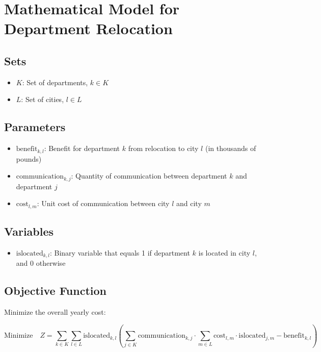 \documentclass{article}
\begin{document}
\section*{Mathematical Model for Department Relocation}

\subsection*{Sets}
\begin{itemize}
    \item \( K \): Set of departments, \( k \in K \)
    \item \( L \): Set of cities, \( l \in L \)
\end{itemize}

\subsection*{Parameters}
\begin{itemize}
    \item \( \text{benefit}_{k,l} \): Benefit for department \( k \) from relocation to city \( l \) (in thousands of pounds)
    \item \( \text{communication}_{k,j} \): Quantity of communication between department \( k \) and department \( j \)
    \item \( \text{cost}_{l,m} \): Unit cost of communication between city \( l \) and city \( m \)
\end{itemize}

\subsection*{Variables}
\begin{itemize}
    \item \( \text{islocated}_{k,l} \): Binary variable that equals 1 if department \( k \) is located in city \( l \), and 0 otherwise
\end{itemize}

\subsection*{Objective Function}
Minimize the overall yearly cost:

\[
\text{Minimize} \quad Z = \sum_{k \in K} \sum_{l \in L} \text{islocated}_{k,l} \left( \sum_{j \in K} \text{communication}_{k,j} \cdot \sum_{m \in L} \text{cost}_{l,m} \cdot \text{islocated}_{j,m} - \text{benefit}_{k,l} \right)
\]
\end{document}
